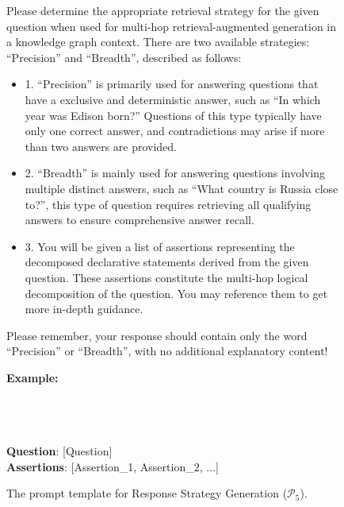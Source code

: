 \documentclass[11pt]{article}
\begin{document}
\begin{figure}[H]
    \centering
    \footnotesize
    \begin{tcolorbox}[
        title={Response Strategy Generation Prompt ($\mathcal{P}_5$)},      %
        colback=gray!5,                        %
        colframe=gray!60,                  %
        coltitle=white,                       %
        fonttitle=\small\bfseries,            %
        boxrule=0.8pt,                        %
        left=2mm, right=2mm, top=2mm, bottom=2mm, %
        arc=1mm,                              %
        width=\columnwidth                      %
    ]
    
    Please determine the appropriate retrieval strategy for the given question when used for multi-hop retrieval-augmented generation in a knowledge graph context. There are two available strategies: ``Precision'' and ``Breadth'', described as follows: \\
    \begin{itemize}
    
    \item 1. ``Precision'' is primarily used for answering questions that have a exclusive and
    deterministic answer, such as ``In which year was Edison born?'' Questions of this type typically have only one correct answer, and contradictions may arise if more than two answers are provided.
    \item 2. ``Breadth'' is mainly used for answering questions involving multiple distinct answers, such as ``What country is Russia close to?'', this type of question requires retrieving all qualifying answers to ensure comprehensive answer recall.
    \item 3. You will be given a list of assertions representing the decomposed declarative statements derived from the given question. These assertions constitute the multi-hop logical decomposition of the question. You may reference them to get more in-depth guidance.
    \end{itemize}

    Please remember, your response should contain only the word ``Precision'' or ``Breadth'', with no additional explanatory content!
    \vspace{0.3cm}

    \textbf{Example:} \\
    \text{[EXAMPLE\_1]} \\
    \text{[EXAMPLE\_2]} \\
    \text{[EXAMPLE\_3]} \\

    \vspace{0.3cm}

    \textbf{Question}: [Question] \\
    \textbf{Assertions}: [Assertion\_1, Assertion\_2, ...]
    \end{tcolorbox}
    \caption{The prompt template for Response Strategy Generation ($\mathcal{P}_5$).}
    \label{fig:p5}
\end{figure}
\end{document}
